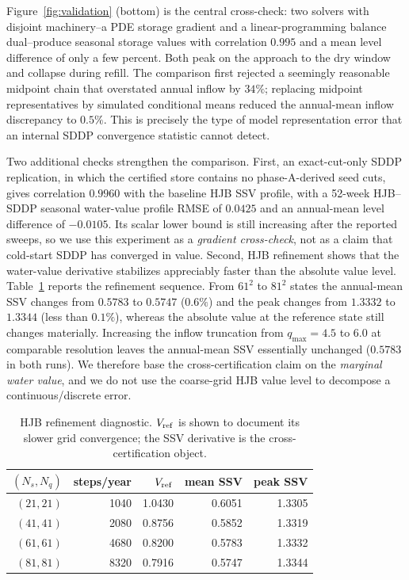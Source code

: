 \documentclass[pdflatex,sn-mathphys-num]{sn-jnl}
\theoremstyle{thmstyleone}
\theoremstyle{thmstyletwo}
\theoremstyle{thmstylethree}
\begin{document}
Figure~\ref{fig:validation} (bottom) is the central cross-check: two solvers
with disjoint machinery--a PDE storage gradient and a linear-programming
balance dual--produce seasonal storage values with correlation $0.995$ and a
mean level difference of only a few percent. Both peak on the approach to the
dry window and collapse during refill. The comparison first rejected a
seemingly reasonable midpoint chain that overstated annual inflow by $34\%$;
replacing midpoint representatives by simulated conditional means reduced the
annual-mean inflow discrepancy to $0.5\%$. This is precisely the type of model
representation error that an internal SDDP convergence statistic cannot
detect.

Two additional checks strengthen the comparison. First, an exact-cut-only
SDDP replication, in which the certified store contains no phase-A-derived
seed cuts, gives correlation $0.9960$ with the baseline HJB SSV profile, with a
52-week HJB--SDDP seasonal water-value profile RMSE of $0.0425$ and an
annual-mean level difference of $-0.0105$. Its scalar lower
bound is still increasing after the reported sweeps, so we use this experiment
as a \emph{gradient cross-check}, not as a claim that cold-start SDDP has
converged in value. Second, HJB refinement shows that the water-value derivative
stabilizes appreciably faster than the absolute value level. Table~\ref{tab:hjbmesh}
reports the refinement sequence. From $61^2$ to $81^2$ states the annual-mean
SSV changes from $0.5783$ to $0.5747$ ($0.6\%$) and the peak changes from
$1.3332$ to $1.3344$ (less than $0.1\%$), whereas the absolute value at the
reference state still changes materially. Increasing the inflow truncation
from $q_{\max}=4.5$ to $6.0$ at comparable resolution leaves the annual-mean
SSV essentially unchanged ($0.5783$ in both runs). We therefore base the
cross-certification claim on the \emph{marginal water value}, and we do not use
the coarse-grid HJB value level to decompose a continuous/discrete error.

\begin{table}[t]
\centering
\caption{HJB refinement diagnostic. $V_{\rm ref}$ is shown to document its
slower grid convergence; the SSV derivative is the cross-certification object.}
\label{tab:hjbmesh}
\begin{tabular}{rrrrr}
\toprule
$(N_s,N_q)$ & steps/year & $V_{\rm ref}$ & mean SSV & peak SSV\\
\midrule
$(21,21)$ & 1040 & 1.0430 & 0.6051 & 1.3305\\
$(41,41)$ & 2080 & 0.8756 & 0.5852 & 1.3319\\
$(61,61)$ & 4680 & 0.8200 & 0.5783 & 1.3332\\
$(81,81)$ & 8320 & 0.7916 & 0.5747 & 1.3344\\
\bottomrule
\end{tabular}
\end{table}
\end{document}
